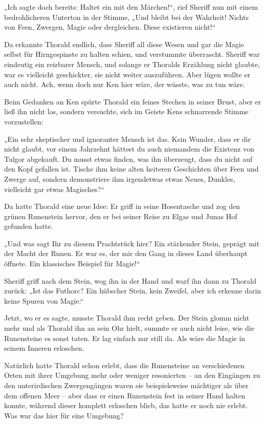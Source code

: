 „Ich sagte doch bereits: Haltet ein mit den Märchen!“, rief Sheriff nun mit einem bedrohlicheren Unterton in der Stimme, „Und bleibt bei der Wahrheit! Nichts von Feen, Zwergen, Magie oder dergleichen. Diese existieren nicht!“

Da erkannte Thorald endlich, dass Sheriff all diese Wesen und gar die Magie selbst für Hirngespinste zu halten schien, und verstummte überrascht. Sheriff war eindeutig ein reizbarer Mensch, und solange er Thoralds Erzählung nicht glaubte, war es vielleicht geschickter, sie nicht weiter auszuführen. Aber lügen wollte er auch nicht. Ach, wenn doch nur Ken hier wäre, der wüsste, was zu tun wäre.

Beim Gedanken an Ken spürte Thorald ein feines Stechen in seiner Brust, aber er ließ ihn nicht los, sondern versuchte, sich im Geiste Kens schnarrende Stimme vorzustellen:

„Ein sehr skeptischer und ignoranter Mensch ist das. Kein Wunder, dass er dir nicht glaubt, vor einem Jahrzehnt hättest du auch niemandem die Existenz von Tulgor abgekauft. Du musst etwas finden, was ihn überzeugt, dass du nicht auf den Kopf gefallen ist. Tische ihm keine alten heiteren Geschichten über Feen und Zwerge auf, sondern demonstriere ihm irgendetwas etwas Neues, Dunkles, vielleicht gar etwas Magisches?“

Da hatte Thorald eine neue Idee: Er griff in seine Hosentasche und zog den grünen Runenstein hervor, den er bei seiner Reise zu Elgas und Junas Hof gefunden hatte.

„Und was sagt Ihr zu diesem Prachtstück hier? Ein stärkender Stein, geprägt mit der Macht der Runen. Er war es, der mir den Gang in dieses Land überhaupt öffnete. Ein klassisches Beispiel für Magie!“

Sheriff griff nach dem Stein, wog ihn in der Hand und warf ihn dann zu Thorald zurück: „Ist das Futhorc? Ein hübscher Stein, kein Zweifel, aber ich erkenne darin keine Spuren von Magie.“

Jetzt, wo er es sagte, musste Thorald ihm recht geben. Der Stein glomm nicht mehr und als Thorald ihn an sein Ohr hielt, summte er auch nicht leise, wie die Runensteine es sonst taten. Er lag einfach nur still da. Als wäre die Magie in seinem Inneren erloschen.

Natürlich hatte Thorald schon erlebt, dass die Runensteine an verschiedenen Orten mit ihrer Umgebung mehr oder weniger resonierten – an den Eingängen zu den unterirdischen Zwergengängen waren sie beispielsweise mächtiger als über dem offenen Meer – aber dass er einen Runenstein fest in seiner Hand halten konnte, während dieser komplett erloschen blieb, das hatte er noch nie erlebt. Was war das hier für eine Umgebung?

